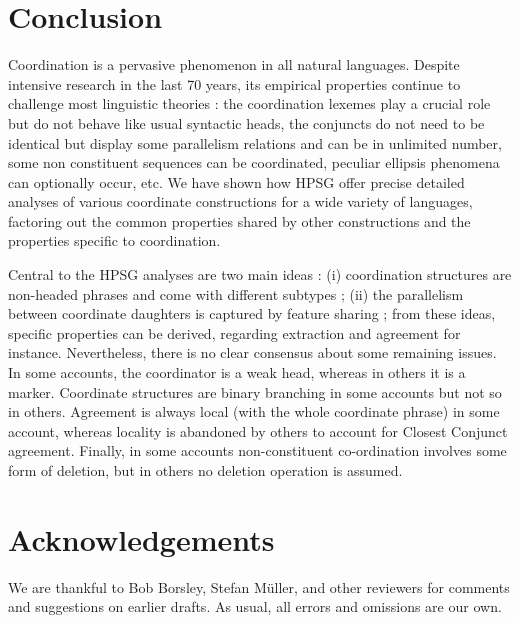 \documentclass[output=paper]{langsci/langscibook}
\begin{document}
\section{Conclusion}

Coordination is a pervasive phenomenon in all natural languages. Despite intensive research in the last 70 years, its empirical properties continue to challenge most linguistic theories :  the coordination lexemes play a crucial role but do not behave like usual syntactic heads, the conjuncts do not need to be identical but display some parallelism relations and can be in unlimited number, some non constituent sequences can be coordinated, peculiar ellipsis phenomena can optionally occur,  etc. We have shown how HPSG offer precise detailed analyses of various coordinate constructions for a wide variety of languages, factoring out the common properties shared by other constructions and the properties specific to coordination.

Central to the HPSG analyses are two main ideas : (i) coordination structures are non-headed phrases and come with different subtypes ; (ii) the parallelism between coordinate daughters is captured by feature sharing ; from these ideas, specific properties can be derived, regarding extraction and agreement for instance. Nevertheless, there is no clear consensus about some remaining issues. In some accounts, the coordinator is a weak head, whereas in others it is a marker. Coordinate structures are binary branching in some accounts but not so in others. Agreement is always local (with the whole coordinate phrase) in some account, whereas locality is abandoned by others to account for Closest Conjunct agreement. Finally, in some accounts non-constituent co-ordination involves some form of deletion, but in others no deletion operation is assumed.

 
\section*{Acknowledgements}

We are thankful to Bob Borsley, Stefan M\"{u}ller, and other reviewers for comments and suggestions on earlier drafts. 
As usual, all errors and omissions are our own.


{\sloppy
\printbibliography[heading=subbibliography,notkeyword=this] 
}
\end{document}
